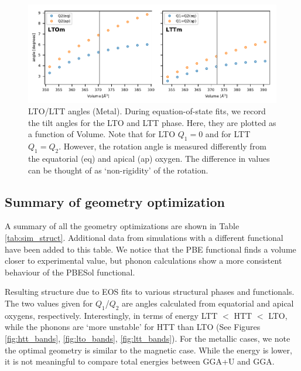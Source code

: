 \begin{figure}
	\centering
	\includegraphics[width=\textwidth]{fig/simulation/angles_metal_lto_ltt.pdf}
	\caption[Metal: LTO/LTT angles during EOS fits]{LTO/LTT angles (Metal). During equation-of-state fits, we record the tilt angles for the LTO and LTT phase. Here, they are plotted as a function of Volume. Note that for LTO $Q_1=0$ and for LTT $Q_1=Q_2$. However, the rotation angle is measured differently from the equatorial (eq) and apical (ap) oxygen. The difference in values can be thought of as `non-rigidity' of the rotation.}
	\label{fig:angles_metal}
\end{figure}


\subsection{Summary of geometry optimization}
A summary of all the geometry optimizations are shown in Table \ref{tab:sim_struct}. Additional data from simulations with a different functional have been added to this table. We notice that the PBE functional finds a volume closer to experimental value, but phonon calculations show a more consistent behaviour of the PBESol functional.


\begin{table}
    \centering
    
    \caption[Simulation Structure Results]{Resulting structure due to EOS fits to various structural phases and functionals. The two values given for $Q_1$/$Q_2$ are angles calculated from equatorial and apical oxygens, respectively. Interestingly, in terms of energy LTT $<$ HTT $<$ LTO, while the phonons are `more unstable' for HTT than LTO (See Figures \ref{fig:htt_bands}, \ref{fig:lto_bands}, \ref{fig:ltt_bands}). For the metallic cases, we note the optimal geometry is similar to the magnetic case. While the energy is lower, it is not meaningful to compare total energies between GGA+U and GGA.}
    \label{tab:sim_struct}
\end{table}


